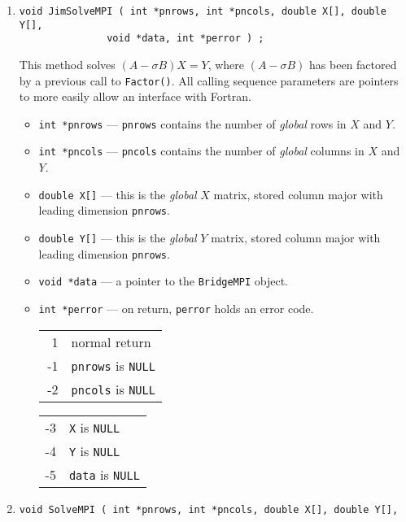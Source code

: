 \begin{enumerate}
\begin{itemize}
\end{itemize}
\item
\begin{verbatim}
void JimSolveMPI ( int *pnrows, int *pncols, double X[], double Y[],
               void *data, int *perror ) ;
\end{verbatim}
This method solves $(A - \sigma B) X = Y$, where 
$(A - \sigma B)$ has been factored by a previous call to {\tt Factor()}.
All calling sequence parameters are pointers to more
easily allow an interface with Fortran.
\begin{itemize}
\item {\tt int *pnrows} --- {\tt *pnrows} contains the number of
      {\it global} rows in $X$ and $Y$.
\item {\tt int *pncols} --- {\tt *pncols} contains the number of
      {\it global} columns in $X$ and $Y$.
\item {\tt double X[]} --- this is the {\it global} $X$ matrix, 
      stored column major with leading dimension {\tt *pnrows}.
\item {\tt double Y[]} --- this is the {\it global} $Y$ matrix, 
      stored column major with leading dimension {\tt *pnrows}.
\item {\tt void *data} --- a pointer to the {\tt BridgeMPI} object.
\item {\tt int *perror} --- on return, {\tt *perror} holds an
      error code.
      \begin{center}
      \begin{tabular}[t]{rl}
      ~1 & normal return \\
      -1 & \texttt{pnrows} is \texttt{NULL} \\
      -2 & \texttt{pncols} is \texttt{NULL}
      \end{tabular}
      \begin{tabular}[t]{rl}
      -3 & \texttt{X} is \texttt{NULL} \\
      -4 & \texttt{Y} is \texttt{NULL} \\
      -5 & \texttt{data} is \texttt{NULL}
      \end{tabular}
      \end{center}
      \end{itemize}
\item
\begin{verbatim}
void SolveMPI ( int *pnrows, int *pncols, double X[], double Y[],

\end{verbatim}
\end{enumerate}
